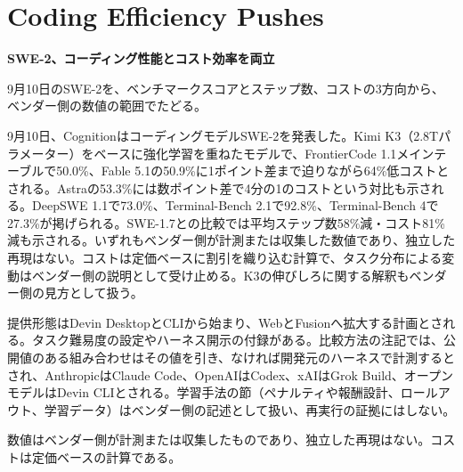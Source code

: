 \section{Coding Efficiency Pushes}
\begin{wideflow}
{\Large\bfseries SWE-2、コーディング性能とコスト効率を両立}\par
\smallskip
{\color{SurveyMuted}9月10日のSWE-2を、ベンチマークスコアとステップ数、コストの3方向から、ベンダー側の数値の範囲でたどる。}\par
\end{wideflow}

9月10日、CognitionはコーディングモデルSWE-2を発表した\cite{swe2}。Kimi K3（2.8Tパラメーター）をベースに強化学習を重ねたモデルで、FrontierCode 1.1メインテーブルで50.0\%、Fable 5.1の50.9\%に1ポイント差まで迫りながら64\%低コストとされる。Astraの53.3\%には数ポイント差で4分の1のコストという対比も示される。DeepSWE 1.1で73.0\%、Terminal-Bench 2.1で92.8\%、Terminal-Bench 4で27.3\%が掲げられる。SWE-1.7との比較では平均ステップ数58\%減・コスト81\%減も示される。いずれもベンダー側が計測または収集した数値であり、独立した再現はない。コストは定価ベースに割引を織り込む計算で、タスク分布による変動はベンダー側の説明として受け止める。K3の伸びしろに関する解釈もベンダー側の見方として扱う。

提供形態はDevin DesktopとCLIから始まり、WebとFusionへ拡大する計画とされる\cite{swe2}。タスク難易度の設定やハーネス開示の付録がある。比較方法の注記では、公開値のある組み合わせはその値を引き、なければ開発元のハーネスで計測するとされ、AnthropicはClaude Code、OpenAIはCodex、xAIはGrok Build、オープンモデルはDevin CLIとされる。学習手法の節（ペナルティや報酬設計、ロールアウト、学習データ）はベンダー側の記述として扱い、再実行の証拠にはしない。

\begin{claimboundary}[コーディング評価の境界]
数値はベンダー側が計測または収集したものであり、独立した再現はない。コストは定価ベースの計算である。
\end{claimboundary}
